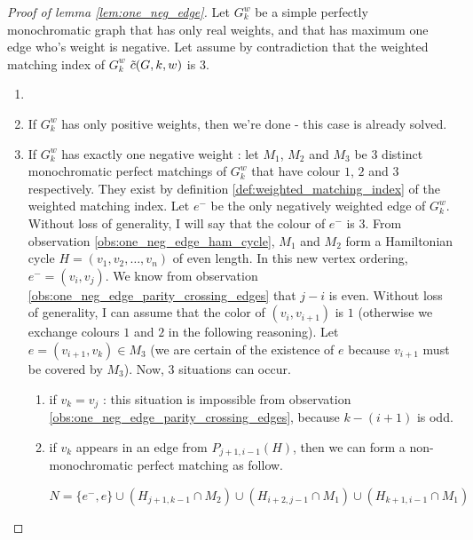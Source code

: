 \begin{proof}[Proof of lemma \ref{lem:one_neg_edge}]

    Let $G_k^w$ be a simple perfectly monochromatic graph that has only real weights, and that has maximum one edge who's weight is negative. Let assume by contradiction that the weighted matching index of $G_k^w$ $\Tilde{c}(G, k, w)$ is $3$.

    \begin{enumerate}
        \item[]

        \item If $G_k^w$ has only positive weights, then we're done - this case is already solved.

        \item If $G_k^w$ has exactly one negative weight : let $M_1$, $M_2$ and $M_3$ be 3 distinct monochromatic perfect matchings of $G_k^w$ that have colour $1$, $2$ and $3$ respectively. They exist by definition \ref{def:weighted_matching_index} of the weighted matching index. Let $e^-$ be the only negatively weighted edge of $G_k^w$. Without loss of generality, I will say that the colour of $e^-$ is $3$. From observation \ref{obs:one_neg_edge_ham_cycle}, $M_1$ and $M_2$ form a Hamiltonian cycle $H = (v_1, v_2, \dots, v_n)$ of even length. In this new vertex ordering, $e^- = (v_i, v_j)$. We know from observation \ref{obs:one_neg_edge_parity_crossing_edges} that $j-i$ is even. Without loss of generality, I can assume that the color of $(v_i, v_{i + 1})$ is $1$ (otherwise we exchange colours $1$ and $2$ in the following reasoning). Let $e = (v_{i + 1}, v_k) \in M_3$ (we are certain of the existence of $e$ because $v_{i+1}$ must be covered by $M_3$). Now, $3$ situations can occur.

        \begin{enumerate}
            \item if $v_k = v_j$ : this situation is impossible from observation \ref{obs:one_neg_edge_parity_crossing_edges}, because $k - (i + 1)$ is odd.

            \item if $v_k$ appears in an edge from $P_{j+1, i-1}(H)$, then we can form a non-monochromatic perfect matching as follow.

            \begin{center}
                $N = \{e^-, e\} \cup (H_{j+1, k-1} \cap M_2) \cup (H_{i + 2, j - 1} \cap M_1) \cup (H_{k+1, i-1} \cap M_1)$
            \end{center}


\end{enumerate}
\end{enumerate}
\end{proof}
